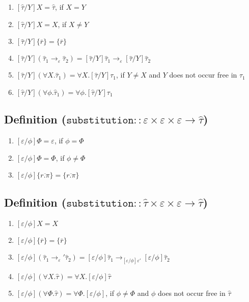 \documentclass{llncs}
\newcommand{\keywadj}[1]{\mathtt{#1}}
\newcommand{\kwa}[1]{\keywadj{ #1 }}
\begin{document}
\begin{enumerate}
	\item $[\hat \tau/Y]X = \hat \tau$, if $X = Y$
	\item $[\hat \tau/Y]X = X$, if $X \neq Y$
	\item $[\hat \tau/Y]\{ \bar r \} = \{ \bar r \}$
	\item $[\hat \tau/Y](\hat \tau_1 \rightarrow_{\varepsilon} \hat \tau_2) = [\hat \tau/Y]\hat \tau_1 \rightarrow_{\varepsilon} [\hat \tau/Y]\hat \tau_2$ 
	\item $[\hat \tau/Y](\forall X. \hat \tau_1) = \forall X. [\hat \tau/Y]\tau_1$, if $Y \neq X$ and $Y$ does not occur free in $\tau_1$
	\item $[\hat \tau/Y](\forall \phi. \hat \tau_1) = \forall \phi. [\hat \tau/Y]\tau_1$
\end{enumerate}

\subsection*{Definition ($\kwa{substitution :: \varepsilon \times \varepsilon \times \varepsilon \rightarrow \hat \tau}$)}

\begin{enumerate}
	\item $[\varepsilon/\phi]\Phi = \varepsilon$, if $\phi = \Phi$
	\item $[\varepsilon/\phi]\Phi = \Phi$, if $\phi \neq \Phi$
	\item $[\varepsilon/\phi]\{ \overline{r.\pi} \} = \{ \overline{r.\pi} \}$
\end{enumerate}

\subsection*{Definition ($\kwa{substitution :: \hat \tau \times \varepsilon \times \varepsilon \rightarrow \hat \tau}$)}

\begin{enumerate}
	\item $[\varepsilon/\phi]X = X$
	\item $[\varepsilon/\phi]\{ \bar r \} = \{ \bar r \}$
	\item $[\varepsilon/\phi](\hat \tau_1 \rightarrow_\varepsilon' \hat \tau_2) = [\varepsilon/\phi]\hat \tau_1 \rightarrow_{[\varepsilon/\phi]\varepsilon'} [\varepsilon/\phi]\hat \tau_2$
	\item $[\varepsilon/\phi](\forall X. \hat \tau) = \forall X. [\varepsilon/\phi]\hat \tau$
	\item $[\varepsilon/\phi](\forall \Phi. \hat \tau) = \forall \Phi. [\varepsilon/\phi]$, if $\phi \neq \Phi$ and $\phi$ does not occur free in $\hat \tau$
\end{enumerate}
\end{document}
